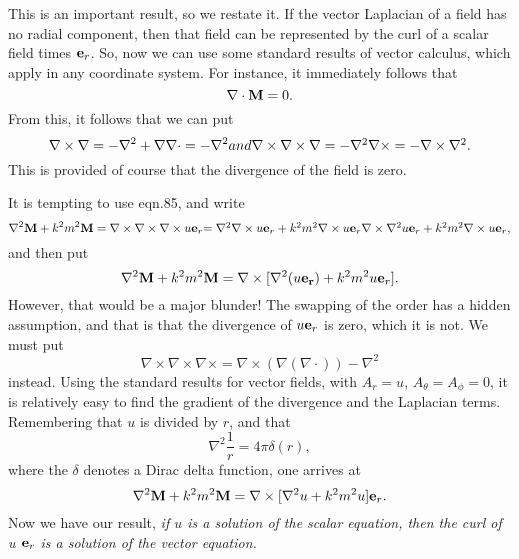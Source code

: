 \documentclass[12pt]{article}
\begin{document}
This is an important result, so we restate it. If the vector Laplacian
of a field has no radial component, then that field can be represented
 by the curl of a scalar field times ${\bf e}_r$. So, now we can use
some standard results of vector calculus, which apply in any 
coordinate system. For instance, it immediately follows that
\begin{equation}
\nabla \cdot {\bf M}=0.
\end{equation}
From this, it follows that we can put
\begin{equation}
\nabla \times \nabla=-\nabla^2+ \nabla \nabla \cdot=-\nabla^2
$$ and $$
\nabla \times \nabla \times \nabla=-\nabla^2 \nabla \times
=-\nabla \times \nabla^2.
\end{equation}
This is provided of course that the divergence of the field is zero.

It is tempting to use eqn.85, and write
\begin{equation}
\nabla^2 {\bf M}+k^2 m^2 {\bf M}
=\nabla \times \nabla \times \nabla \times u {\bf e}_r
$$    $$
=\nabla^2 \nabla \times u {\bf e}_r+k^2 m^2 \nabla \times u {\bf e}_r
  \nabla \times \nabla^2 u{\bf e}_r+k^2 m^2 \nabla \times u
{\bf e}_r,    
\end{equation}
and then put
\begin{equation}
\nabla^2 {\bf M}+k^2 m^2 {\bf M}=\nabla \times
[\nabla^2 (u {\bf e_r})+k^2 m^2 u {\bf e}_r].
\end{equation}
However, that would be a major blunder! The swapping of the
order has a hidden assumption, and that is that the divergence
of $u {\bf e}_r$ is zero, which it is not.
We must put
\begin{equation}
\nabla \times \nabla \times \nabla \times=
\nabla \times ( \nabla (\nabla \cdot))-\nabla^2 
\end{equation}
instead.
Using the standard results for vector fields, with $A_r=u$,
 $A_\theta=A_\phi=0$, it is relatively easy to  find the gradient of the divergence and the Laplacian terms. Remembering that $u$ is divided by $r$, and
that
\begin{equation}
 \nabla^2 \frac{1}{r}= 4 \pi \delta (r), 
\end{equation}
where the $\delta$ denotes a Dirac delta function,
one arrives at
\begin{equation}
\nabla^2 {\bf M}+k^2 m^2 {\bf M}=
\nabla \times [\nabla^2 u+k^2 m^2 u]{\bf e}_r.
\end{equation}
Now we have our result,
 {\it if $u$ is a solution of the scalar equation, then the curl of 
u ${\bf e}_r$ is a solution of the vector equation.}
\end{document}
